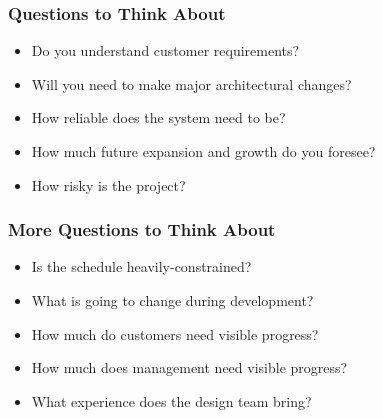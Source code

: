 \begin{frame}
\frametitle{Questions to Think About}

\large
\begin{changemargin}{0.5cm}
\begin{itemize}
\item Do you understand customer requirements?\\[0.5em]
\item Will you need to make major architectural changes?\\[0.5em]
\item How reliable does the system need to be?\\[0.5em]
\item How much future expansion and growth do you foresee?\\[0.5em]
\item How risky is the project?
\end{itemize}
\end{changemargin}
\end{frame}

\begin{frame}
\frametitle{More Questions to Think About}

\large
\begin{changemargin}{0.5cm}
\begin{itemize}
\item Is the schedule heavily-constrained?\\[0.5em]
\item What is going to change during development?\\[0.5em]
\item How much do customers need visible progress?\\[0.5em]
\item How much does management need visible progress?\\[0.5em]
\item What experience does the design team bring?
\end{itemize}
\end{changemargin}
\end{frame}

